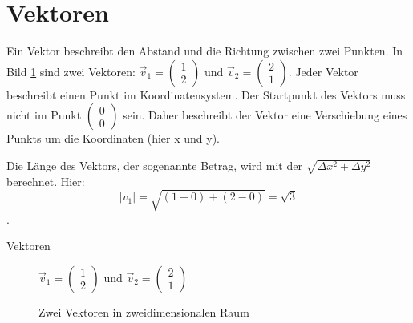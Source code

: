 \documentclass[aspectratio=169, ignorenonframetext]{beamer}
\begin{document}
\section{Vektoren}

Ein Vektor beschreibt den Abstand und die Richtung zwischen zwei Punkten. In Bild \ref{fig:ZweiVektoren} sind zwei Vektoren: $\vec{v}_1= \left(\begin{array}{c} 1 \\ 2 \end{array}\right)$ und  $\vec{v}_2= \left(\begin{array}{c} 2 \\ 1 \end{array}\right)$. Jeder Vektor beschreibt einen Punkt im Koordinatensystem. Der Startpunkt des Vektors muss nicht im Punkt $\left(\begin{array}{c}0\\0\end{array}\right)$ sein. Daher beschreibt der Vektor eine Verschiebung eines Punkts um die Koordinaten (hier x und y).

Die Länge des Vektors, der sogenannte Betrag, wird mit der $\sqrt{\Delta x^2 + \Delta y^2}$ berechnet. Hier: \[|v_1| = \sqrt{(1 - 0) + (2 - 0)} = \sqrt{3}\].
\begin{frame}{Vektoren}
  \begin{figure}[htb]

    $\vec{v}_1= \left(\begin{array}{c} 1 \\ 2 \end{array}\right)$ und  $\vec{v}_2= \left(\begin{array}{c} 2 \\ 1 \end{array}\right)$
    \caption{Zwei Vektoren in zweidimensionalen Raum}
    \label{fig:ZweiVektoren}
  \end{figure}
\end{frame}
\end{document}
